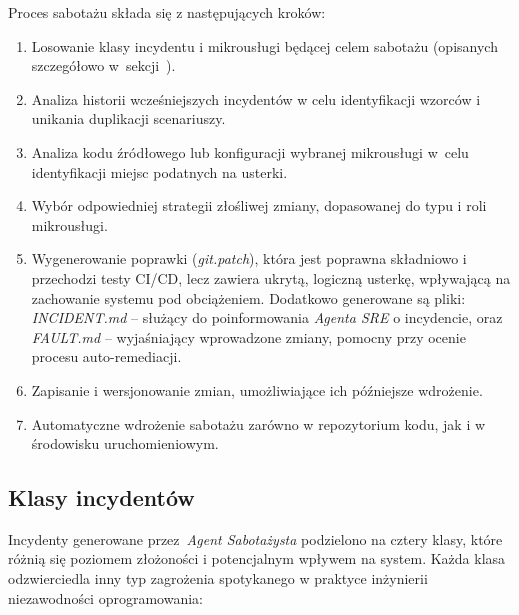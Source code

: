 Proces sabotażu składa się z następujących kroków:
\begin{enumerate}
    \item Losowanie klasy incydentu i mikrousługi będącej celem sabotażu (opisanych szczegółowo w~sekcji~).
    \item Analiza historii wcześniejszych incydentów w celu identyfikacji wzorców i unikania duplikacji scenariuszy.
    \item Analiza kodu źródłowego lub konfiguracji wybranej mikrousługi w~celu identyfikacji miejsc podatnych na usterki.
    \item Wybór odpowiedniej strategii złośliwej zmiany, dopasowanej do typu i roli mikrousługi.
    \item Wygenerowanie poprawki (\textit{git.patch}), która jest poprawna składniowo i przechodzi testy CI/CD, lecz zawiera ukrytą, logiczną usterkę, wpływającą na zachowanie systemu pod obciążeniem. Dodatkowo generowane są pliki: \textit{INCIDENT.md} – służący do poinformowania \textit{Agenta SRE} o incydencie, oraz \textit{FAULT.md} – wyjaśniający wprowadzone zmiany, pomocny przy ocenie procesu auto-remediacji.
    \item Zapisanie i wersjonowanie zmian, umożliwiające ich późniejsze wdrożenie.
    \item Automatyczne wdrożenie sabotażu zarówno w repozytorium kodu, jak i w środowisku uruchomieniowym.
\end{enumerate}

\subsection{Klasy incydentów}
\label{subsec:klasy-incydentow}
Incydenty generowane przez~\textit{Agent Sabotażysta} podzielono na cztery klasy, które różnią się poziomem złożoności i potencjalnym wpływem na system. Każda klasa odzwierciedla inny typ zagrożenia spotykanego w praktyce inżynierii niezawodności oprogramowania:

